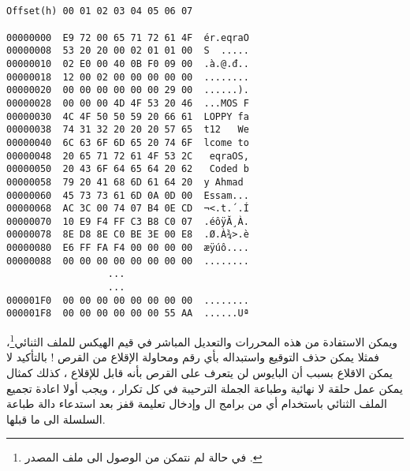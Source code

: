 \documentclass[document.tex]{subfiles}
\begin{document}
\begin{english}


\begin{lstlisting}[label=lst:bootloader_hex,caption=\en{Hex value of bootloader}]


Offset(h) 00 01 02 03 04 05 06 07

00000000  E9 72 00 65 71 72 61 4F  ér.eqraO
00000008  53 20 20 00 02 01 01 00  S  .....
00000010  02 E0 00 40 0B F0 09 00  .à.@.đ..
00000018  12 00 02 00 00 00 00 00  ........
00000020  00 00 00 00 00 00 29 00  ......).
00000028  00 00 00 4D 4F 53 20 46  ...MOS F
00000030  4C 4F 50 50 59 20 66 61  LOPPY fa
00000038  74 31 32 20 20 20 57 65  t12   We
00000040  6C 63 6F 6D 65 20 74 6F  lcome to
00000048  20 65 71 72 61 4F 53 2C   eqraOS,
00000050  20 43 6F 64 65 64 20 62   Coded b
00000058  79 20 41 68 6D 61 64 20  y Ahmad 
00000060  45 73 73 61 6D 0A 0D 00  Essam...
00000068  AC 3C 00 74 07 B4 0E CD  ¬<.t.´.Í
00000070  10 E9 F4 FF C3 B8 C0 07  .éôÿĂ¸À.
00000078  8E D8 8E C0 BE 3E 00 E8  .Ø.À¾>.è
00000080  E6 FF FA F4 00 00 00 00  æÿúô....
00000088  00 00 00 00 00 00 00 00  ........
                  ...
                  ...
000001F0  00 00 00 00 00 00 00 00  ........
000001F8  00 00 00 00 00 00 55 AA  ......Uª

\end{lstlisting}
\end{english}

ويمكن الاستفادة من هذه المحررات والتعديل المباشر في قيم الهيكس للملف الثنائي\footnote{في حالة لم نتمكن من الوصول الى ملف المصدر .}، فمثلا يمكن حذف التوقيع واستبداله بأي رقم ومحاولة الإقلاع من القرص ! بالتأكيد لا يمكن الاقلاع بسبب أن البايوس لن يتعرف على القرص بأنه قابل للإقلاع ، كذلك كمثال يمكن عمل حلقة لا نهائية وطباعة الجملة الترحيبة في كل تكرار ، ويجب أولا اعادة تجميع الملف الثنائي باستخدام أي من برامج ال  وإدخال تعليمة قفز بعد استدعاء دالة طباعة السلسلة الى ما قبلها.\\

\begin{english}
\lstset{numberstyle=\tiny,numbers=left,stepnumber=1,numbersep=5pt,tabsize=2,extendedchars=true,breaklines=true,frame=b,showspaces=false, showtabs=false,xleftmargin=10pt,framexleftmargin=10pt,framexrightmargin=5pt,framexbottommargin=4pt,showstringspaces=false,language=[x86masm]Assembler}


\end{english}
\end{document}

